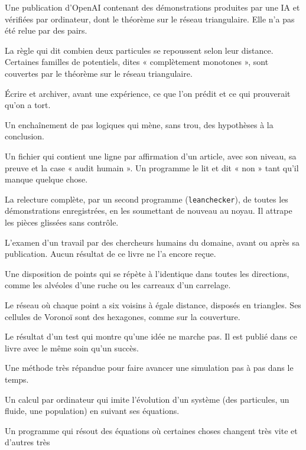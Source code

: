 \begin{description}[style=nextline,leftmargin=0pt,font=\normalfont\sffamily\bfseries\color{okbleu},itemsep=5pt]
\item[openai/math] Une publication d'OpenAI contenant des démonstrations produites par une IA et vérifiées par
ordinateur, dont le théorème sur le réseau triangulaire. Elle n'a pas été relue par des pairs.
\item[Potentiel (ou force) répulsif] La règle qui dit combien deux particules se repoussent selon leur distance.
Certaines familles de potentiels, dites « complètement monotones », sont couvertes par le théorème sur le réseau
triangulaire.
\item[Pré-enregistrement] Écrire et archiver, avant une expérience, ce que l'on prédit et ce qui prouverait qu'on a
tort.
\item[Preuve (démonstration)] Un enchaînement de pas logiques qui mène, sans trou, des hypothèses à la conclusion.
\item[Registre des affirmations] Un fichier qui contient une ligne par affirmation d'un article, avec son niveau, sa
preuve et la case « audit humain ». Un programme le lit et dit « non » tant qu'il manque quelque chose.
\item[Rejeu] La relecture complète, par un second programme (\texttt{leanchecker}), de toutes les démonstrations
enregistrées, en les soumettant de nouveau au noyau. Il attrape les pièces glissées sans contrôle.
\item[Relecture par des pairs] L'examen d'un travail par des chercheurs humains du domaine, avant ou après sa
publication. Aucun résultat de ce livre ne l'a encore reçue.
\item[Réseau (cristallin)] Une disposition de points qui se répète à l'identique dans toutes les directions, comme les
alvéoles d'une ruche ou les carreaux d'un carrelage.
\item[Réseau triangulaire] Le réseau où chaque point a six voisins à égale distance, disposés en triangles. Ses
cellules de Voronoï sont des hexagones, comme sur la couverture.
\item[Résultat négatif] Le résultat d'un test qui montre qu'une idée ne marche pas. Il est publié dans ce livre avec
le même soin qu'un succès.
\item[RK4] Une méthode très répandue pour faire avancer une simulation pas à pas dans le temps.
\item[Simulation] Un calcul par ordinateur qui imite l'évolution d'un système (des particules, un fluide, une
population) en suivant ses équations.
\item[Solveur raide] Un programme qui résout des équations où certaines choses changent très vite et d'autres très

\end{description}
